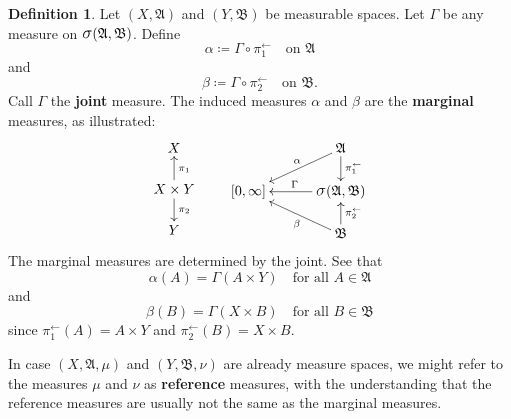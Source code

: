 \documentclass[
twoside=true,
paper=letter,
fontsize=11pt,
pagesize=auto,
leqno,
openany,
headsepline,
overfullrule,
]{scrbook}
\theoremstyle{plain}
\theoremstyle{plain}
\theoremstyle{definition}
\newtheorem{defn}[thm]{Definition}
\theoremstyle{bfnoteitalic}
\theoremstyle{bfnoteroman}
\newcommand{\sigalg}[1]{\mathfrak{#1}}
\newcommand{\definedby}{\coloneqq}
\newcommand{\sagb}{\mathop{\hbox{\large{$\sigma$}}}\nolimits}
\newcommand{\preimage}[1]{#1^{\leftarrow}}
\newcommand{\sigmaalgebra}{\sigalg{A}}
\newcommand{\sigmaalgebraii}{\sigalg{B}}
\newcommand{\productsig}[2]{\sagb(#1,#2)}
\newcommand{\measurespace}{X}
\newcommand{\measurespaceii}{Y}
\newcommand{\measmu}{\mu}
\newcommand{\measnu}{\nu}
\newcommand{\seti}{A}
\newcommand{\setii}{B}
\newcommand{\projectionone}{\pi_1}
\newcommand{\projectiontwo}{\pi_2}
\newcommand{\measonprod}{\Gamma}%
\newcommand{\marginalone}{\alpha}%
\newcommand{\marginaltwo}{\beta}%
\begin{document}
\begin{defn}\label{marginals}
Let $(\measurespace,\sigmaalgebra)$ and 
$(\measurespaceii,\sigmaalgebraii)$ be measurable spaces.
Let $\measonprod$ be any measure on
$\productsig{\sigmaalgebra}{\sigmaalgebraii}$.
Define
\[
\marginalone\definedby
\measonprod \circ \preimage{\projectionone}
\quad
\text{on }
\sigmaalgebra
\]
and
\[
\marginaltwo\definedby
\measonprod \circ \preimage{\projectiontwo}
\quad
\text{on }
\sigmaalgebraii.
\]
Call $\measonprod$ the \textbf{joint} measure.
The induced measures
$\marginalone$ and $\marginaltwo$ are the \textbf{marginal} measures, as illustrated:
\[
\xymatrix@R=16pt@C=30pt{
\measurespace 
\\
\measurespace\times\measurespaceii 
\ar[u]_{\projectionone}
\ar[d]^{\projectiontwo} 
\\
\measurespaceii
}
\qquad
\xymatrix@R=16pt@C=30pt{ 
 & \sigmaalgebra 
 \ar[d]^-{\preimage{\projectionone}} 
 \ar[dl]_-{\marginalone} 
\\
[0,\infty] 
& \productsig{\sigmaalgebra}{\sigmaalgebraii} \ar[l]_{\measonprod}
\\
 & \sigmaalgebraii \ar[u]_-{\preimage{\projectiontwo}} 
 \ar[ul]^-{\marginaltwo}
\\
}
\]
The marginal measures are determined by the joint.
See that
\[
\marginalone(\seti)=\measonprod(\seti\times\measurespaceii)
\quad
\text{for all $\seti\in\sigmaalgebra$}
\]
and
\[
\marginaltwo(\setii)=\measonprod(\measurespace\times\setii)
\quad
\text{for all $\setii\in\sigmaalgebraii$}
\]
since
$\preimage{\projectionone}(\seti) = \seti\times\measurespaceii$
and
$\preimage{\projectiontwo}(\setii) = \measurespace\times\setii$.


In case  $(\measurespace,\sigmaalgebra,\measmu)$ and
$(\measurespaceii,\sigmaalgebraii,\measnu)$ are already measure spaces, we might refer to the measures
$\measmu$ and $\measnu$ as \textbf{reference} measures, with the understanding that the reference measures are usually not the same as the marginal measures.
\end{defn}
\end{document}
